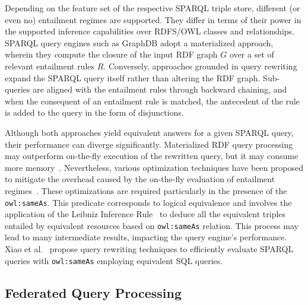 \documentclass[a4paper,USenglish]{tgdk-v2021}
\begin{document}
Depending on the feature set of the respective SPARQL triple store, different (or even no) entailment regimes are supported.
They differ in terms of their power in the supported inference capabilities over RDFS/OWL classes and relationships.
SPARQL query engines such as GraphDB adopt a materialized approach, wherein they compute the closure of the input RDF graph $G$ over a set of relevant entailment rules $R$. Conversely, approaches grounded in query rewriting expand the SPARQL query itself rather than altering the RDF graph. Sub-queries are aligned with the entailment rules through backward chaining, and when the consequent of an entailment rule is matched, the antecedent of the rule is added to the query in the form of disjunctions.

Although both approaches yield equivalent answers for a given SPARQL query, their performance can diverge significantly. 
Materialized RDF query processing may outperform on-the-fly execution of the rewritten query, but it may consume more memory~\cite{DBLP:conf/aaai/GlimmKKS15}. Nevertheless, various optimization techniques have been proposed to mitigate the overhead caused by the on-the-fly evaluation of entailment regimes~\cite{DBLP:journals/ws/TrivelaSCS15}. These optimizations are required particularly in the presence of the \texttt{owl:sameAs}. This predicate corresponds to logical equivalence and involves the application of the Leibniz Inference Rule~\cite{DBLP:books/sp/GriesS93} to deduce all the equivalent triples entailed by equivalent resources based on \texttt{owl:sameAs} relation. 
This process may lead to many intermediate results, impacting the query engine's performance. Xiao et al.~\cite{DBLP:conf/esws/XiaoHBRGC18} propose query rewriting techniques to efficiently evaluate SPARQL queries with \texttt{owl:sameAs} employing equivalent SQL queries.

\subsection{Federated Query Processing}
\label{subsec:federatedQueries}
\end{document}
